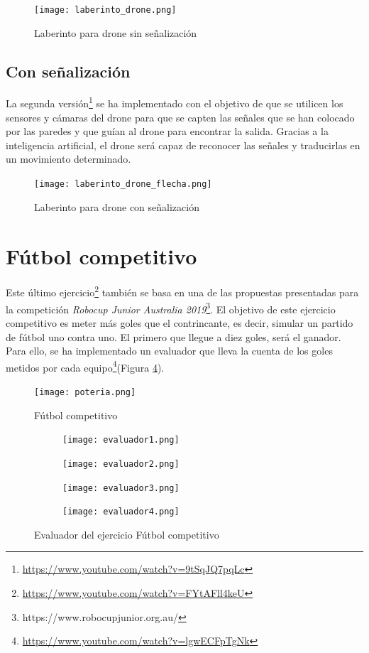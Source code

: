 \clearpage
\begin{figure}[h!]
    \centering
    \texttt{[image: laberinto\_drone.png]}
    \caption{Laberinto para drone sin señalización}
    \label{fig:Laberinto_drone}
\end{figure}


\subsection{Con señalización}
La segunda versión\footnote{\url{https://www.youtube.com/watch?v=9tSqJQ7pqLc}} se ha implementado con el objetivo de que se utilicen los sensores y cámaras del drone para que se capten las señales que se han colocado por las paredes y que guían al drone para encontrar la salida. Gracias a la inteligencia artificial, el drone será capaz de reconocer las señales y traducirlas en un movimiento determinado.

\begin{figure}[h!]
    \centering
    \texttt{[image: laberinto\_drone\_flecha.png]}
    \caption{Laberinto para drone con señalización}
    \label{fig:Laberinto_drone_señal}
\end{figure}

\section{Fútbol competitivo}
Este último ejercicio\footnote{\url{https://www.youtube.com/watch?v=FYtAFll4keU}} también se basa en una de las propuestas presentadas para la competición \textit{Robocup Junior Australia 2019}\footnote{https://www.robocupjunior.org.au/}. El objetivo de este ejercicio competitivo es meter más goles que el contrincante, es decir, simular un partido de fútbol uno contra uno. El primero que llegue a diez goles, será el ganador. Para ello, se ha implementado un evaluador que lleva la cuenta de los goles metidos por cada equipo\footnote{\url{https://www.youtube.com/watch?v=lgwECFpTgNk}}(Figura \ref{fig:evaluador}). 

\begin{figure}[h!]
    \centering
    \texttt{[image: poteria.png]}
    \caption{Fútbol competitivo}
    \label{fig:futbol}
\end{figure}

\begin{figure}[h!]
  \begin{subfigure}[b]{0.5\textwidth}
    \texttt{[image: evaluador1.png]}
  \end{subfigure}
  \hfill
  \hfill
  \begin{subfigure}[b]{0.5\textwidth}
    \texttt{[image: evaluador2.png]}
  \end{subfigure}
    \hfill
    \hfill
  \begin{subfigure}[b]{0.5\textwidth}
    \texttt{[image: evaluador3.png]}
  \end{subfigure}
    \hfill
  \begin{subfigure}[b]{0.5\textwidth}
    \texttt{[image: evaluador4.png]}
  \end{subfigure}
\caption{Evaluador del ejercicio Fútbol competitivo}
\label{fig:evaluador}
\end{figure}

